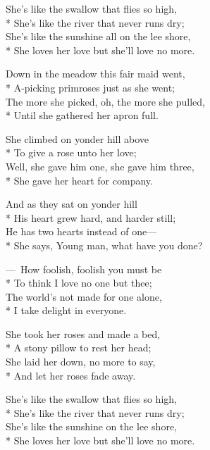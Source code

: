 

\versemark
She’s like the swallow that flies so high,\\*
She’s like the river that never runs dry;\\
She’s like the sunshine all on the lee shore,\\*
She loves her love but she’ll love no more.

\versemark
Down in the meadow this fair maid went,\\*
A-picking primroses just as she went;\\
The more she picked, oh, the more she pulled,\\*
Until she gathered her apron full.

\versemark
She climbed on yonder hill above\\*
To give a rose unto her love;\\
Well, she gave him one, she gave him three,\\*
She gave her heart for company.

\versemark
And as they sat on yonder hill\\*
His heart grew hard, and harder still;\\
He has two hearts instead of one—\\*
She says, Young man, what have you done?

\versemark
— How foolish, foolish you must be\\*
To think I love no one but thee;\\
The world’s not made for one alone,\\*
I take delight in everyone.

\versemark
She took her roses and made a bed,\\*
A stony pillow to rest her head;\\
She laid her down, no more to say,\\*
And let her roses fade away.

\versemark
She’s like the swallow that flies so high,\\*
She’s like the river that never runs dry;\\
She’s like the sunshine on the lee shore,\\*
She loves her love but she’ll love no more.

